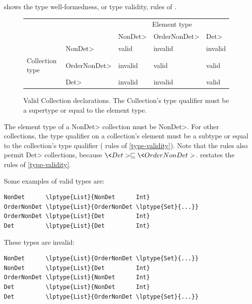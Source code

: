  shows the type well-formedness, or type validity,
rules of \ourTypeSystem. 

\begin{figure}
    \centering
    \begin{tabular}{|l|l|l|l|l|}
        \cline{3-5}
        \multicolumn{2}{c|}{~}  &  \multicolumn{3}{c|}{Element type} \\ \cline{3-5}
        \multicolumn{2}{c|}{~}  & \<NonDet>     & \<OrderNonDet> & \<Det> \\ \hline
                        & \<NonDet>      &  valid     &  invalid    & invalid  \\ \cline{2-5}
        Collection type & \<OrderNonDet> &  invalid   &  valid      & valid    \\ \cline{2-5}
                        & \<Det>         &  invalid   &  invalid    & valid    \\ \hline
    \end{tabular}
    \caption{Valid Collection declarations.  The Collection's type qualifier
        must be a supertype or equal to the element type.}
    \label{fig:determinism-collections}
\end{figure}

The element type of a \<NonDet> collection must be \<NonDet>.
For other collections, the type qualifier on a collection's element must be a subtype or equal to
the collection's type qualifier ( rules of
\cref{type-validity}). Note that the  rules also
permit \<Det> collections,
because $\<Det> \sqsubseteq \<OrderNonDet>$.
 restates the  rules
of
\cref{type-validity}.

\smallskip
\noindent
\begin{minipage}{.48\textwidth}
Some examples of valid types are:
\begin{Verbatim}[commandchars=\\\{\}]
NonDet      \lptype{List}{NonDet      Int}
OrderNonDet \lptype{List}{OrderNonDet \lptype{Set}{...}}
OrderNonDet \lptype{List}{Det         Int}
Det         \lptype{List}{Det         Int}

\end{Verbatim}
\end{minipage}
\hfill
\begin{minipage}{.46\textwidth}
These types are invalid:
\begin{Verbatim}[commandchars=\\\{\}]
NonDet      \lptype{List}{OrderNonDet \lptype{Set}{...}}
NonDet      \lptype{List}{Det         Int}
OrderNonDet \lptype{List}{NonDet      Int}
Det         \lptype{List}{NonDet      Int}
Det         \lptype{List}{OrderNonDet \lptype{Set}{...}}
\end{Verbatim}
\end{minipage}
\smallskip


